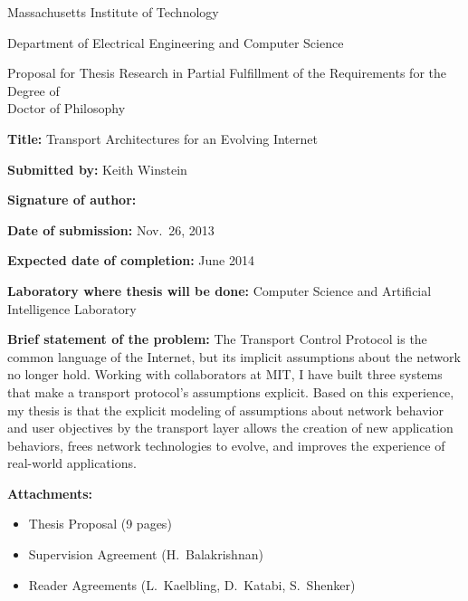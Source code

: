 \documentclass{article}
\begin{document}
\begin{centering}
{\sc Massachusetts Institute of Technology}

Department of Electrical Engineering and Computer Science

Proposal for Thesis Research in Partial Fulfillment of the
Requirements for the Degree of\\{\sc Doctor of Philosophy}

\vspace{\baselineskip}

\end{centering}

\thispagestyle{empty}

{\bf Title:} Transport Architectures for an Evolving Internet

{\bf Submitted by:} Keith Winstein

{\bf Signature of author:}

{\bf Date of submission:} Nov.~26, 2013

{\bf Expected date of completion:} June 2014

{\bf Laboratory where thesis will be done:} Computer Science and Artificial
Intelligence Laboratory

{\bf Brief statement of the problem:} The Transport Control Protocol
is the common language of the Internet, but its implicit assumptions
about the network no longer hold. Working with collaborators at MIT, I
have built three systems that make a transport protocol's assumptions
explicit. Based on this experience, my thesis is that the explicit
modeling of assumptions about network behavior and user objectives by
the transport layer allows the creation of new application behaviors,
frees network technologies to evolve, and improves the experience of
real-world applications.

{\bf Attachments:}

\begin{itemize}

\item Thesis Proposal (9 pages)

\item Supervision Agreement (H.~Balakrishnan)

\item Reader Agreements (L.~Kaelbling, D.~Katabi, S.~Shenker)

\end{itemize}
\end{document}
